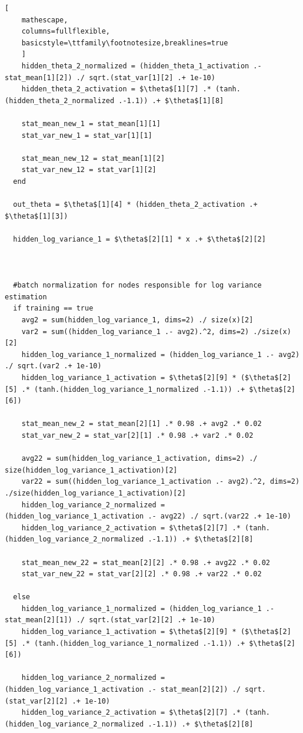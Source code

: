 \documentclass[12pt,letter]{article}
\begin{document}
\begin{enumerate}
\begin{lstlisting}[
    mathescape,
    columns=fullflexible,
    basicstyle=\ttfamily\footnotesize,breaklines=true
    ]
    hidden_theta_2_normalized = (hidden_theta_1_activation .- stat_mean[1][2]) ./ sqrt.(stat_var[1][2] .+ 1e-10)
    hidden_theta_2_activation = $\theta$[1][7] .* (tanh.(hidden_theta_2_normalized .-1.1)) .+ $\theta$[1][8]

    stat_mean_new_1 = stat_mean[1][1]
    stat_var_new_1 = stat_var[1][1]

    stat_mean_new_12 = stat_mean[1][2]
    stat_var_new_12 = stat_var[1][2]
  end

  out_theta = $\theta$[1][4] * (hidden_theta_2_activation .+ $\theta$[1][3])

  hidden_log_variance_1 = $\theta$[2][1] * x .+ $\theta$[2][2]


  
  #batch normalization for nodes responsible for log variance estimation
  if training == true
    avg2 = sum(hidden_log_variance_1, dims=2) ./ size(x)[2]
    var2 = sum((hidden_log_variance_1 .- avg2).^2, dims=2) ./size(x)[2]
    hidden_log_variance_1_normalized = (hidden_log_variance_1 .- avg2) ./ sqrt.(var2 .+ 1e-10)
    hidden_log_variance_1_activation = $\theta$[2][9] * ($\theta$[2][5] .* (tanh.(hidden_log_variance_1_normalized .-1.1)) .+ $\theta$[2][6])

    stat_mean_new_2 = stat_mean[2][1] .* 0.98 .+ avg2 .* 0.02
    stat_var_new_2 = stat_var[2][1] .* 0.98 .+ var2 .* 0.02

    avg22 = sum(hidden_log_variance_1_activation, dims=2) ./ size(hidden_log_variance_1_activation)[2]
    var22 = sum((hidden_log_variance_1_activation .- avg2).^2, dims=2) ./size(hidden_log_variance_1_activation)[2]
    hidden_log_variance_2_normalized = (hidden_log_variance_1_activation .- avg22) ./ sqrt.(var22 .+ 1e-10)
    hidden_log_variance_2_activation = $\theta$[2][7] .* (tanh.(hidden_log_variance_2_normalized .-1.1)) .+ $\theta$[2][8]

    stat_mean_new_22 = stat_mean[2][2] .* 0.98 .+ avg22 .* 0.02
    stat_var_new_22 = stat_var[2][2] .* 0.98 .+ var22 .* 0.02

  else
    hidden_log_variance_1_normalized = (hidden_log_variance_1 .- stat_mean[2][1]) ./ sqrt.(stat_var[2][2] .+ 1e-10)
    hidden_log_variance_1_activation = $\theta$[2][9] * ($\theta$[2][5] .* (tanh.(hidden_log_variance_1_normalized .-1.1)) .+ $\theta$[2][6])

    hidden_log_variance_2_normalized = (hidden_log_variance_1_activation .- stat_mean[2][2]) ./ sqrt.(stat_var[2][2] .+ 1e-10)
    hidden_log_variance_2_activation = $\theta$[2][7] .* (tanh.(hidden_log_variance_2_normalized .-1.1)) .+ $\theta$[2][8]


\end{lstlisting}
\end{enumerate}
\end{document}
